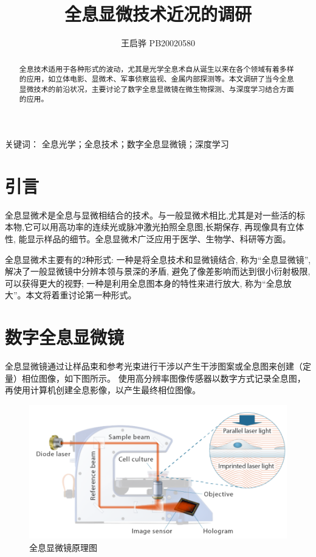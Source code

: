 \documentclass{article}
\title{\songti \zihao{2}\bfseries 全息显微技术近况的调研}
\author{王启骅 PB20020580}
\begin{document}
	\maketitle
	\begin{abstract}
		\kaishu{}\quad 全息技术适用于各种形式的波动，尤其是光学全息术自从诞生以来在各个领域有着多样的应用，如立体电影、显微术、军事侦察监视、金属内部探测等。本文调研了当今全息显微技术的前沿状况，主要讨论了数字全息显微镜在微生物探测、与深度学习结合方面的应用。
		
		
	\end{abstract}
	\hspace{1.4cm}\heiti{}\quad 关键词：
	\kaishu{}全息光学；全息技术；数字全息显微镜；深度学习
	\section{引言}
	\songti{}
全息显微术是全息与显微相结合的技术。与一般显微术相比,尤其是对一些活的标本物,它可以用高功率的连续光或脉冲激光拍照全息图,长期保存, 再现像具有立体性, 能显示样品的细节。全息显微术广泛应用于医学、生物学、科研等方面。

	
	
	全息显微术主要有的2种形式: 一种是将全息技术和显微镜结合, 称为“全息显微镜”, 解决了一般显微镜中分辨本领与景深的矛盾, 避免了像差影响而达到很小衍射极限, 可以获得更大的视野; 一种是利用全息图本身的特性来进行放大, 称为“全息放大”。本文将着重讨论第一种形式。
	\section{数字全息显微镜}
	

	\songti{}\indent
全息显微镜通过让样品束和参考光束进行干涉以产生干涉图案或全息图来创建（定量）相位图像，如下图所示。	使用高分辨率图像传感器以数字方式记录全息图，再使用计算机创建全息影像，以产生最终相位图像。
  \begin{figure}[!h]
	\centering
	\includegraphics[scale=0.4]{全息显微镜原理图}
	\caption{\heiti{}全息显微镜原理图}
	
\end{figure}
\end{document}
